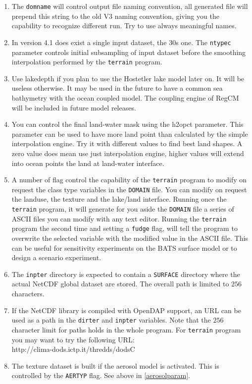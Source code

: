 \begin{enumerate}
\item The \verb=domname= will control output file naming convention, all
generated file will prepend this string to the old V3 naming convention,
giving you the capability to recognize different run. Try to use always
meaningful names.
\item In version 4.1 does exist a single input dataset, the 30s one. The
\verb=ntypec= parameter controls initial subsampling of input dataset before
the smoothing interpolation performed by the \verb=terrain= program.
\item Use lakedepth if you plan to use the Hostetler lake model later on.
It will be useless otherwise. It may be used in the future to
have a common sea bathymetry with the ocean coupled model. The coupling
engine of RegCM will be included in future model releases.
\item You can control the final land-water mask using the h2opct parameter.
This parameter can be used to have more land point than calculated by
the simple interpolation engine. Try it with different values to find best
land shapes. A zero value does mean use just interpolation engine, higher
values will extend into ocean points the land at land-water interface.
\item A number of flag control the capability of the \verb=terrain= program
to modify on request the class type variables in the \verb=DOMAIN= file. You can
modify on request the landuse, the texture and the lake/land interface.
Running once the \verb=terrain= program, it will generate for you aside the
\verb=DOMAIN= file a series of ASCII files you can modify with any text
editor. Running the \verb=terrain= program the second time and setting
a \verb=fudge= flag, will tell the program to overwrite the selected
variable with the modified value in the ASCII file. This can be useful
for sensitivity experiments on the BATS surface model or to design
a scenario experiment.
\item The \verb=inpter= directory is expected to contain a \verb=SURFACE=
directory where the actual NetCDF global dataset are stored. The overall
path is limited to $256$ characters.
\label{pathnote}
\item If the NetCDF library is compiled with OpenDAP support, an URL
can be used as a path in the \verb=dirter= and \verb=inpter= variables.
Note that the $256$ character limit for paths holds in the whole program.
For \verb=terrain= program you may want to try the following URL: \\
http://clima-dods.ictp.it/thredds/dodsC
\item The texture dataset is built if the aerosol model is activated.
This is controlled by the \verb=AERTYP= flag. See above in \ref{aerosolparam}.
\end{enumerate}

